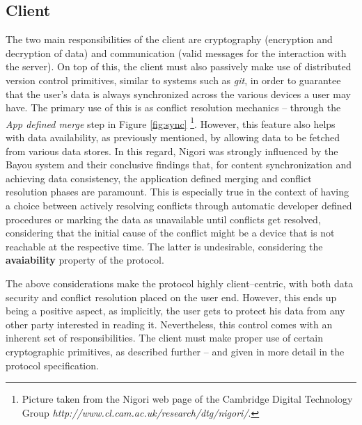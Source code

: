 \subsection{Client}
The two main responsibilities of the client are cryptography (encryption and decryption of data) and communication (valid messages for the interaction with the server).
On top of this, the client must also passively make use of distributed version control primitives, similar to systems such as \textit{git}, in order to guarantee that the user's data is always synchronized across the various devices a user may have.
The primary use of this is as conflict resolution mechanics -- through the \textit{App defined merge} step in Figure \ref{fig:sync} \footnote{Picture taken from the Nigori web page of the Cambridge Digital Technology Group \textit{http://www.cl.cam.ac.uk/research/dtg/nigori/}.}.
However, this feature also helps with data availability, as previously mentioned, by allowing data to be fetched from various data stores.
In this regard, Nigori was strongly influenced by the Bayou system \cite{Bayou} and their conclusive findings that, for content synchronization and achieving data consistency, the application defined merging and conflict resolution phases are paramount.
This is especially true in the context of having a choice between actively resolving conflicts through automatic developer defined procedures or marking the data as unavailable until conflicts get resolved, considering that the initial cause of the conflict might be a device that is not reachable at the respective time.
The latter is undesirable, considering the \textbf{avaiability} property of the protocol.


The above considerations make the protocol highly client--centric, with both data security and conflict resolution placed on the user end.
However, this ends up being a positive aspect, as implicitly, the user gets to protect his data from any other party interested in reading it.
Nevertheless, this control comes with an inherent set of responsibilities.
The client must make proper use of certain cryptographic primitives, as described further -- and given in more detail in the protocol specification.

